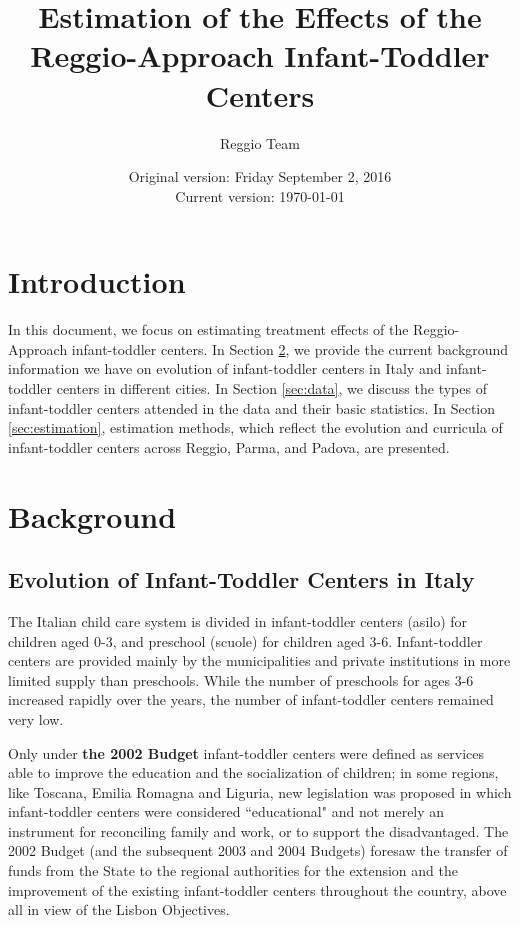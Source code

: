 



\title{Estimation of the Effects of the Reggio-Approach Infant-Toddler Centers}
\author{Reggio Team}
\date{Original version: Friday September 2, 2016 \\ Current version: \today}
\maketitle

\doublespacing

\section{Introduction}
In this document, we focus on estimating treatment effects of the Reggio-Approach infant-toddler centers. In Section \ref{sec:background}, we provide the current background information we have on evolution of infant-toddler centers in Italy and infant-toddler centers in different cities. In Section \ref{sec:data}, we discuss the types of infant-toddler centers attended in the data and their basic statistics. In Section \ref{sec:estimation}, estimation methods, which reflect the evolution and curricula of infant-toddler centers across Reggio, Parma, and Padova, are presented.


\section{Background} \label{sec:background}
\subsection{Evolution of Infant-Toddler Centers in Italy}
The Italian child care system is divided in infant-toddler centers (asilo) for children aged 0-3, and preschool (scuole) for children aged 3-6. Infant-toddler centers are provided mainly by the municipalities and private institutions in more limited supply than preschools. While the number of preschools for ages 3-6 increased rapidly over the years, the number of infant-toddler centers remained very low.  

Only under \textbf{the 2002 Budget} infant-toddler centers were defined as services able to improve the education and the socialization of children; in some regions, like Toscana, Emilia Romagna and Liguria, new legislation was proposed in which infant-toddler centers were considered ``educational" and not merely an instrument for reconciling family and work, or to support the disadvantaged. The 2002 Budget (and the subsequent 2003 and 2004 Budgets) foresaw the transfer of funds from the State to the regional authorities for the extension and the improvement of the existing infant-toddler centers throughout the country, above all in view of the Lisbon Objectives. 

